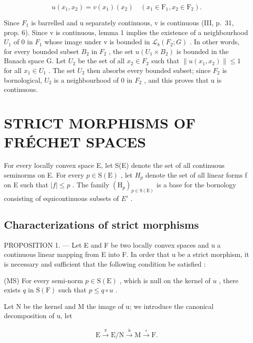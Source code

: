 \[
u (x _ {1}, x _ {2}) = v (x _ {1}) \left(x _ {2}\right) \quad \left(x _ {1} \in \mathrm{F} _ {1}, x _ {2} \in \mathrm{F} _ {2}\right).
\]

Since \(F_{1}\) is barrelled and u separately continuous, v is continuous (III, p.~31, prop. 6). Since v is continuous, lemma 1 implies the existence of a neighbourhood \(U_{1}\) of 0 in \(F_{1}\) whose image under v is bounded in \(\mathcal{L}_{b}(F_{2}; G)\) . In other words, for every bounded subset \(B_{2}\) in \(F_{2}\) , the set \(u(U_{1} \times B_{2})\) is bounded in the Banach space G. Let \(U_{2}\) be the set of all \(x_{2} \in F_{2}\) such that \(\|u(x_{1}, x_{2})\| \leqslant 1\) for all \(x_{1} \in U_{1}\) . The set \(U_{2}\) then absorbs every bounded subset; since \(F_{2}\) is bornological, \(U_{2}\) is a neighbourhood of 0 in \(F_{2}\) , and this proves that u is continuous.

\section{STRICT MORPHISMS OF FRÉCHET SPACES}

For every locally convex space E, let S(E) denote the set of all continuous seminorms on E. For every \(p \in \mathrm{S}(\mathrm{E})\) , let \(H_{p}\) denote the set of all linear forms f on E such that \(|f| \leqslant p\) . The family \((\mathrm{H}_{p})_{p \in \mathrm{S}(\mathrm{E})}\) is a base for the bornology consisting of equicontinuous subsets of \(E'\) .

\subsection{Characterizations of strict morphisms}

PROPOSITION 1. --- Let E and F be two locally convex spaces and u a continuous linear mapping from E into F. In order that u be a strict morphism, it is necessary and sufficient that the following condition be satisfied :

(MS) For every semi-norm \(p \in \mathrm{S}(\mathrm{E})\) , which is null on the kernel of \(u\) , there exists \(q\) in \(\mathrm{S}(\mathrm{F})\) such that \(p \leqslant q \circ u\) .

Let N be the kernel and M the image of u; we introduce the canonical decomposition of u, let

\[
\mathrm{E} \xrightarrow {\pi} \mathrm{E} / \mathrm{N} \xrightarrow {\tilde {u}} \mathrm{M} \xrightarrow {\iota} \mathrm{F}.
\]


